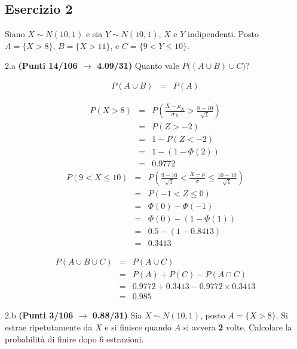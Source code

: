 \documentclass[
  11pt,
]{book}
\theoremstyle{mytheoremstyle}
\theoremstyle{mydefstyle}
\newenvironment{sol}
  {
  \begin{tcolorbox}[enhanced,breakable,arc=0.1mm,boxrule=1pt,colback=white,colframe=iblue,
  title=\bf \fontfamily{lmss}\selectfont \hspace{.5 cm} Soluzione,drop fuzzy shadow]

}{
\end{tcolorbox}
  }
\begin{document}
\subsection{Esercizio 2}\label{esercizio-2-14}

Siano \(X\sim N(10,1)\) e sia \(Y\sim N(10,1)\), \(X\) e \(Y\) indipendenti. Posto \(A=\{X>8\}\), \(B=\{X>11\}\), e \(C=\{9<Y\le 10\}\).

2.a \textbf{(Punti 14/106 \(\rightarrow\) 4.09/31)} Quanto vale \(P\Big((A\cup B)\cup C\Big)\)?

\begin{sol}
\begin{eqnarray*}
P(A\cup B)&=&P(A)
\end{eqnarray*}

\begin{eqnarray*}
      P( X   >   8 ) 
        &=& P\left(  \frac { X  -  \mu_X }{ \sigma_X }  >  \frac { 8  -  10 }{\sqrt{ 1 }} \right)  \\
                 &=& P\left(  Z   >   -2 \right) \\    &=& 1-P(Z< -2 )\\ 
                 &=&  1-(1-\Phi( 2 )) \\ &=&  0.9772 
      \end{eqnarray*}\begin{eqnarray*}
   P( 9 < X \leq  10 ) &=& P\left( \frac { 9  -  10 }{\sqrt{ 1 }} < \frac { X  -  \mu }{ \sigma } \leq \frac { 10  -  10 }{\sqrt{ 1 }}\right)  \\
              &=& P\left(  -1  < Z \leq  0 \right) \\
              &=& \Phi( 0 )-\Phi( -1 )\\
              &=&  \Phi( 0 )-(1-\Phi( 1 )) \\ &=&  0.5 -(1- 0.8413 ) \\ 
              &=&  0.3413 
   \end{eqnarray*}

\begin{eqnarray*}
P(A\cup B\cup C)&=&P(A\cup C)\\
&=&P(A)+P(C)-P(A\cap C)\\
&=& 0.9772 +0.3413-0.9772\times 0.3413\\
&=& 0.985
\end{eqnarray*}

\end{sol}

2.b \textbf{(Punti 3/106 \(\rightarrow\) 0.88/31)} Sia \(X\sim N(10,1)\), posto \(A=\{X>8\}\). Si estrae ripetutamente da \(X\) e si finisce quando \(A\) si avvera \textbf{2} volte. Calcolare la probabilità di finire dopo 6 estrazioni.
\end{document}
